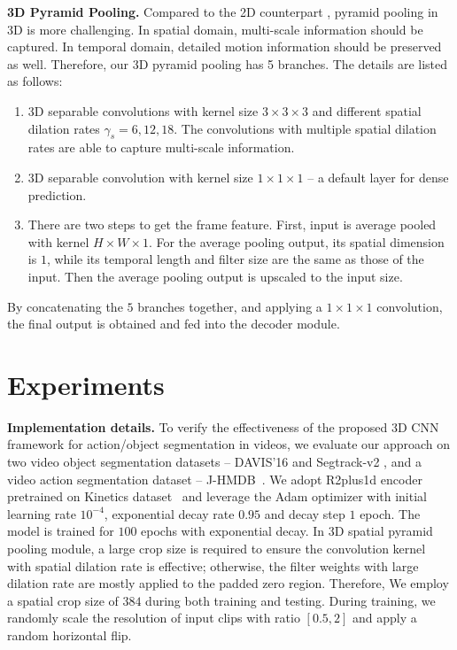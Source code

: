 \documentclass{bmvc2k}
\begin{document}
\textbf{3D Pyramid Pooling.}
Compared to the 2D counterpart \cite{chen2018deeplab}, pyramid pooling in 3D is more challenging. In spatial domain, multi-scale information should be captured. In temporal domain, detailed motion information should be preserved as well.
Therefore, our 3D pyramid pooling has 5 branches. The details are listed as follows:
\begin{enumerate}\item 3D separable convolutions with kernel size $3\times3\times3$ and different spatial dilation rates $\gamma_s = {6, 12, 18}$. The convolutions with multiple spatial dilation rates are able to capture multi-scale information. 

\item 3D separable convolution with kernel size $1\times1\times1$ -- a default layer for dense prediction.

\item There are two steps to get the frame feature. First, input is average pooled with kernel $H\times W \times 1$. For the average pooling output, its spatial dimension is $1$, while its temporal length and filter size are the same as those of the input. Then the average pooling output is upscaled to the input size.
\end{enumerate}

By concatenating the $5$ branches together, and applying a $1\times1\times1$ convolution, the final output is obtained and fed into the decoder module.


\section{Experiments}
\label{sec:experiments}
\textbf{Implementation details.} 
To verify the effectiveness of the proposed 3D CNN framework for action/object segmentation in videos, we evaluate our approach on two video object segmentation datasets -- DAVIS'16 \cite{Perazzi2016} and Segtrack-v2 \cite{li2013video}, and a video action segmentation dataset -- J-HMDB~\cite{Jhuang:ICCV:2013}. We adopt R2plus1d encoder pretrained on Kinetics dataset~\cite{zisserman2017kinetics} and leverage the Adam optimizer with initial learning rate $10^{-4}$, exponential decay rate $0.95$ and decay step $1$ epoch. The model is trained for $100$ epochs with exponential decay.
In 3D spatial pyramid pooling module, a large crop size is required to ensure the convolution kernel with spatial dilation rate is effective; otherwise, the filter weights with large dilation rate are mostly applied to the padded zero region. Therefore, We employ a spatial crop size of $384$ during both training and testing.
During training, we randomly scale the resolution of input clips with ratio $[0.5,2]$ and apply a random horizontal flip.
\end{document}
